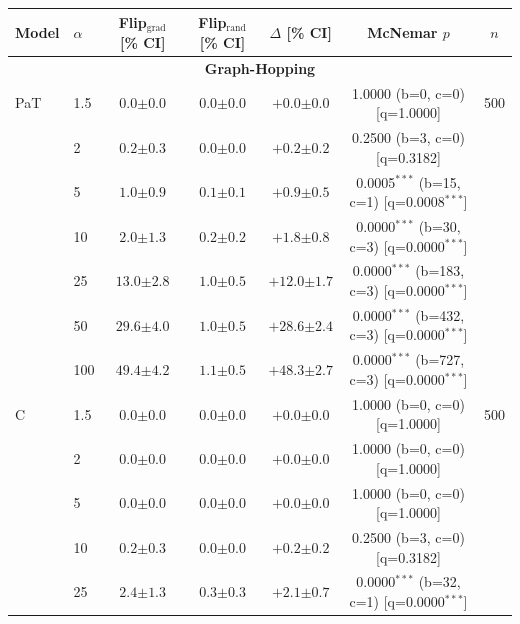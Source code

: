 \begin{table}[h!]
\centering
\tiny
\setlength{\tabcolsep}{4pt}
\begin{tabular}{l l cccc c}
\toprule
Model & $\alpha$ & Flip$_{\text{grad}}$ [\% CI] & Flip$_{\text{rand}}$ [\% CI] & $\Delta$ [\% CI] & McNemar $p$ & $n$ \\
\midrule
\multicolumn{7}{c}{\textbf{Graph-Hopping}} \\
\midrule
PaT & 1.5 & $0.0 {\scriptstyle \pm 0.0}$ & $0.0 {\scriptstyle \pm 0.0}$ & $+0.0 {\scriptstyle \pm 0.0}$ & 1.0000 (b=0, c=0) [q=1.0000] & 500 \\
 & 2 & $0.2 {\scriptstyle \pm 0.3}$ & $0.0 {\scriptstyle \pm 0.0}$ & $+0.2 {\scriptstyle \pm 0.2}$ & 0.2500 (b=3, c=0) [q=0.3182] &  \\
 & 5 & $1.0 {\scriptstyle \pm 0.9}$ & $0.1 {\scriptstyle \pm 0.1}$ & $+0.9 {\scriptstyle \pm 0.5}$ & 0.0005$^{***}$ (b=15, c=1) [q=0.0008$^{***}$] &  \\
 & 10 & $2.0 {\scriptstyle \pm 1.3}$ & $0.2 {\scriptstyle \pm 0.2}$ & $+1.8 {\scriptstyle \pm 0.8}$ & 0.0000$^{***}$ (b=30, c=3) [q=0.0000$^{***}$] &  \\
 & 25 & $13.0 {\scriptstyle \pm 2.8}$ & $1.0 {\scriptstyle \pm 0.5}$ & $+12.0 {\scriptstyle \pm 1.7}$ & 0.0000$^{***}$ (b=183, c=3) [q=0.0000$^{***}$] &  \\
 & 50 & $29.6 {\scriptstyle \pm 4.0}$ & $1.0 {\scriptstyle \pm 0.5}$ & $+28.6 {\scriptstyle \pm 2.4}$ & 0.0000$^{***}$ (b=432, c=3) [q=0.0000$^{***}$] &  \\
 & 100 & $49.4 {\scriptstyle \pm 4.2}$ & $1.1 {\scriptstyle \pm 0.5}$ & $+48.3 {\scriptstyle \pm 2.7}$ & 0.0000$^{***}$ (b=727, c=3) [q=0.0000$^{***}$] &  \\
\midrule
C & 1.5 & $0.0 {\scriptstyle \pm 0.0}$ & $0.0 {\scriptstyle \pm 0.0}$ & $+0.0 {\scriptstyle \pm 0.0}$ & 1.0000 (b=0, c=0) [q=1.0000] & 500 \\
 & 2 & $0.0 {\scriptstyle \pm 0.0}$ & $0.0 {\scriptstyle \pm 0.0}$ & $+0.0 {\scriptstyle \pm 0.0}$ & 1.0000 (b=0, c=0) [q=1.0000] &  \\
 & 5 & $0.0 {\scriptstyle \pm 0.0}$ & $0.0 {\scriptstyle \pm 0.0}$ & $+0.0 {\scriptstyle \pm 0.0}$ & 1.0000 (b=0, c=0) [q=1.0000] &  \\
 & 10 & $0.2 {\scriptstyle \pm 0.3}$ & $0.0 {\scriptstyle \pm 0.0}$ & $+0.2 {\scriptstyle \pm 0.2}$ & 0.2500 (b=3, c=0) [q=0.3182] &  \\
 & 25 & $2.4 {\scriptstyle \pm 1.3}$ & $0.3 {\scriptstyle \pm 0.3}$ & $+2.1 {\scriptstyle \pm 0.7}$ & 0.0000$^{***}$ (b=32, c=1) [q=0.0000$^{***}$] &  \\

\end{tabular}
\end{table}
